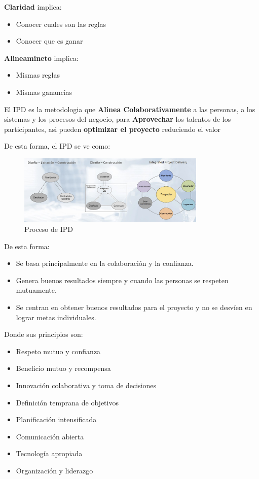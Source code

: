 \textbf{Claridad} implica:

\begin{itemize}
    \item Conocer cuales son las reglas
    \item Conocer que es ganar
\end{itemize}

\textbf{Alineamineto} implica:

\begin{itemize}
    \item Mismas reglas
    \item Mismas ganancias
\end{itemize}

El IPD es la metodologia que \textbf{Alinea Colaborativamente} a las personas, a los sistemas y los procesos del negocio, para \textbf{Aprovechar}
los talentos de los participantes, asi pueden \textbf{optimizar el proyecto} reduciendo el valor 

De esta forma, el IPD se ve como:

\begin{figure}[H]
\centering
\includegraphics[width=0.8\textwidth]{IMAGENES/IPD.png}
\caption{Proceso de IPD}
\label{fig:ipd}
\end{figure}

De esta forma:

\begin{itemize}
    \item Se basa principalmente en la colaboración y la confianza.
    \item Genera buenos resultados siempre y cuando las personas se respeten mutuamente.
    \item Se centran en obtener buenos resultados para el proyecto y no se desvíen en lograr metas individuales.
\end{itemize}

Donde sus principios son:

\begin{itemize}
    \item Respeto mutuo y confianza
    \item Beneficio mutuo y recompensa
    \item Innovación colaborativa y toma de decisiones
    \item Definición temprana de objetivos
    \item Planificación intensificada
    \item Comunicación abierta
    \item Tecnología apropiada
    \item Organización y liderazgo
\end{itemize}

